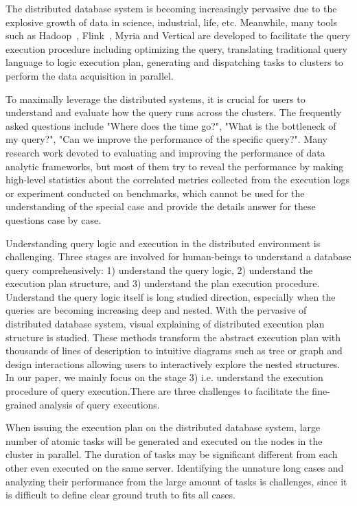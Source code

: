 The distributed database system is becoming increasingly pervasive due to the explosive growth of data in science, industrial, life, etc.
Meanwhile, many tools such as Hadoop~\cite{hadoop}, Flink~\cite{carbone2015apache}, Myria and Vertical are developed to facilitate the query execution procedure including optimizing the query, translating traditional query language to logic execution plan, generating and dispatching tasks to clusters to perform the data acquisition in parallel.

To maximally leverage the distributed systems, it is crucial for users to understand and evaluate how the query runs across the clusters. The frequently asked questions include "Where does the time go?", "What is the bottleneck of my query?", "Can we improve the performance of the specific query?".  Many research work devoted to evaluating and improving the performance of data analytic frameworks, but most of them try to reveal the performance by making high-level statistics about the correlated metrics collected from the execution logs or experiment conducted on benchmarks, which cannot be used for the understanding of the special case and provide the details answer for these questions case by case. 

Understanding query logic and execution in the distributed environment is challenging. Three stages are involved for human-beings to understand a database query comprehensively: 1) understand the query logic, 2) understand the execution plan structure, and 3) understand the plan execution procedure.
Understand the query logic itself is long studied direction, especially when the queries are becoming increasing deep and nested.
With the pervasive of distributed database system, visual explaining of distributed execution plan structure is studied. These methods transform the abstract execution plan with thousands of lines of description to intuitive diagrams such as tree or graph and design interactions allowing users to interactively explore the nested structures.
In our paper, we mainly focus on the stage 3) i.e. understand the execution procedure of query execution.There are three challenges to facilitate the fine-grained analysis of query executions.

When issuing the execution plan on the distributed database system, large number of atomic tasks will be generated and executed on the nodes in the cluster in parallel. The duration of tasks may be significant different from each other even executed on the same server. Identifying the unnature long cases and analyzing their performance from the large amount of tasks is challenges, since it is difficult to define clear ground truth to fits all cases.

